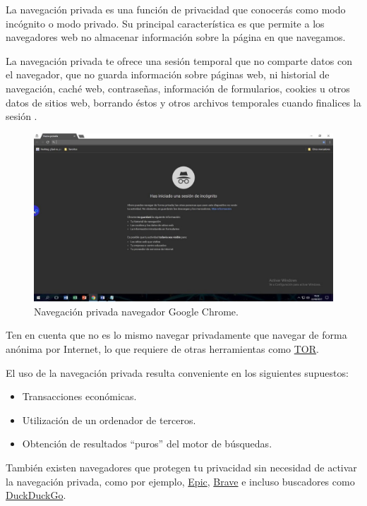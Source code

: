 \documentclass[
  a4paper,
  openany]{book}
\providecommand{\tightlist}{%
  \setlength{\itemsep}{0pt}\setlength{\parskip}{0pt}}
\begin{document}
La navegación privada es una función de privacidad que conocerás como modo incógnito o modo privado. Su principal característica es que permite a los navegadores web no almacenar información sobre la página en que navegamos.

La navegación privada te ofrece una sesión temporal que no comparte datos con el navegador, que no guarda información sobre páginas web, ni historial de navegación, caché web, contraseñas, información de formularios, cookies u otros datos de sitios web, borrando éstos y otros archivos temporales cuando finalices la sesión \citep{navegacion-privada}.

\begin{figure}

{\centering \includegraphics[width=0.75\linewidth]{images/navegacion-privada} 

}

\caption{Navegación privada navegador Google Chrome.}\label{fig:unnamed-chunk-4}
\end{figure}

Ten en cuenta que no es lo mismo navegar privadamente que navegar de forma anónima por Internet, lo que requiere de otras herramientas como \href{https://www.torproject.org/}{TOR}.

El uso de la navegación privada resulta conveniente en los siguientes supuestos:

\begin{itemize}
\tightlist
\item
  Transacciones económicas.
\item
  Utilización de un ordenador de terceros.
\item
  Obtención de resultados ``puros'' del motor de búsquedas.
\end{itemize}

También existen navegadores que protegen tu privacidad sin necesidad de activar la navegación privada, como por ejemplo, \href{https://www.epicbrowser.com/}{Epic}, \href{https://brave.com/es/}{Brave} e incluso buscadores como \href{https://duckduckgo.com/}{DuckDuckGo}.
\end{document}
